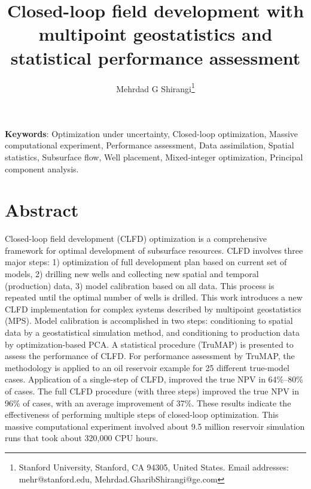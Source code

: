 \documentclass[11pt]{article}
\begin{document}
\title{Closed-loop field development with multipoint geostatistics and statistical performance assessment}
\author{Mehrdad G Shirangi\footnote{Stanford University, Stanford, CA 94305, United States. Email addresses: mehr@stanford.edu, Mehrdad.GharibShirangi@ge.com }}

\maketitle

\date{}




\textbf{Keywords}:
Optimization under uncertainty,
Closed-loop optimization,
Massive computational experiment,
Performance assessment,
Data assimilation,
Spatial statistics,
Subsurface flow,
Well placement,
Mixed-integer optimization,
Principal component analysis.

\section*{Abstract}
\label{Sec:Abstract} %
Closed-loop field development (CLFD) optimization is a comprehensive framework for optimal development of subsurface resources. CLFD involves three major steps: 1) optimization of full development plan based on current set of models, 2) drilling new wells and collecting new spatial and temporal (production) data, 3) model calibration based on all data.
This process is repeated until the optimal number of wells is drilled.
This work introduces a new CLFD implementation for complex systems described by multipoint geostatistics (MPS). Model calibration is accomplished in two steps: conditioning to spatial data by a geostatistical simulation method, and conditioning to production data by optimization-based PCA.
A statistical procedure (TruMAP) is presented to assess the performance of CLFD.
For performance assessment by TruMAP,
the methodology is applied to an oil reservoir example for 25 different true-model cases.
Application of a single-step of CLFD, improved the true NPV in 64\%--80\% of cases. The full CLFD procedure (with three steps) improved the true NPV in 96\% of cases, with an average improvement of 37\%.
These results indicate the effectiveness of performing multiple steps of closed-loop optimization.
This massive computational experiment involved about 9.5 million reservoir simulation runs that took about 320,000 CPU hours.
\end{document}
